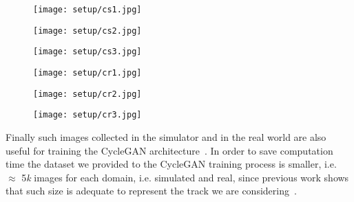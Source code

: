 \begin{figure}[h]
	\begin{minipage}{.33\textwidth}
		\centering
		\texttt{[image: setup/cs1.jpg]}
	\end{minipage}%
	\begin{minipage}{.33\textwidth}
		\centering
		\texttt{[image: setup/cs2.jpg]}
	\end{minipage}%
	\begin{minipage}{.33\textwidth}
		\centering
		\texttt{[image: setup/cs3.jpg]}
	\end{minipage}
	\label{fig:datasetsimcropped}
\end{figure}

\begin{figure}[h]
	\begin{minipage}{.33\textwidth}
		\centering
		\texttt{[image: setup/cr1.jpg]}
	\end{minipage}%
	\begin{minipage}{.33\textwidth}
		\centering
		\texttt{[image: setup/cr2.jpg]}
	\end{minipage}%
	\begin{minipage}{.33\textwidth}
		\centering
		\texttt{[image: setup/cr3.jpg]}
	\end{minipage}
	\label{fig:datasetrealcropped}
\end{figure}

Finally such images collected in the simulator and in the real world are also useful for training the CycleGAN architecture~\cite{CycleGAN2017}. In order to save computation time the dataset we provided to the CycleGAN training process is smaller, i.e. $\approx$ 5\textit{k} images for each domain, i.e. simulated and real, since previous work shows that such size is adequate to represent the track we are considering~\cite{stocco-mind}.


